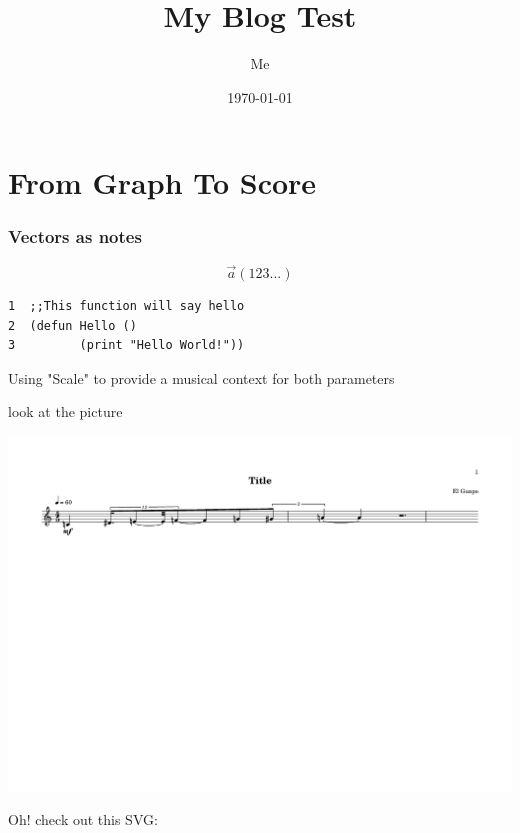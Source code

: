 \documentclass[11pt]{article}
\author{Me}
\date{\today}
\title{My Blog Test}
\begin{document}
\maketitle
\tableofcontents


\section{From Graph To Score}
\label{sec:org1695886}

\subsubsection{Vectors as notes}
\label{sec:org8f8ad16}
\begin{equation}                       
\vec{a}(1 2 3 ...)                             
\end{equation} 

\begin{verbatim}
1  ;;This function will say hello
2  (defun Hello ()
3         (print "Hello World!"))
\end{verbatim}

Using "Scale" to provide a musical context for both parameters 

look at the picture 
\begin{center}
\includegraphics[width=.9\linewidth]{test.png}
\end{center}

Oh! check out this SVG:
\begin{center}

\end{center}
\end{document}
